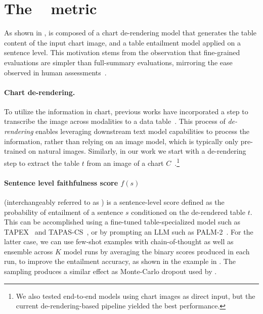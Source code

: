 \section{The \metric{} \criticemoji{}~ metric}
As shown in , \metric{} is composed of a chart de-rendering model that generates the table content of the input chart image, and a table entailment model applied on a sentence level.
This motivation stems from the observation that fine-grained evaluations are simpler than full-summary evaluations, mirroring the ease observed in human assessments~\cite{krishna-etal-2023-longeval}.%

\paragraph{Chart de-rendering.} To utilize the information in chart, previous works have incorporated a step to transcribe the image across modalities to a data table~\citep{luo2021chartocr,kantharaj-etal-2022-chart,liu-etal-2023-deplot}. This process of \emph{de-rendering} enables leveraging downstream text model capabilities to process the information, rather than relying on an image model, which is typically only pre-trained on natural images.
Similarly, in our work we start with a de-rendering step to extract the table $t$ from an image of a chart $C$~\cite{liu-etal-2023-deplot}.\footnote{We also tested end-to-end models using chart images as direct input, but the current de-rendering-based pipeline yielded the best performance.}





\paragraph{Sentence level faithfulness score $f(s)$} (interchangeably referred to as \metric{}) is a sentence-level score defined as the probability of entailment of a sentence $s$ conditioned on the de-rendered table $t$.
This can be accomplished using a fine-tuned table-specialized model such as TAPEX~\cite{liu2022tapex} and TAPAS-CS~\cite{eisenschlos-etal-2020-understanding}, or by prompting an LLM such as PALM-2~\cite{anil2023palm}.
For the latter case, we can use few-shot examples with chain-of-thought as well as ensemble across $K$ model runs by averaging the binary scores produced in each run, to improve the entailment accuracy, as shown in the example in . The sampling produces a similar effect as Monte-Carlo dropout used by \citet{steen-etal-2023-little}.














